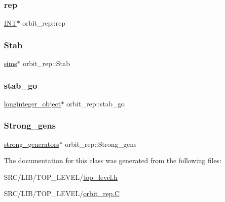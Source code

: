 \mbox{\label{classorbit__rep_a67d318af0ad6f7d7f2094e50801501b7}} 
\subsubsection{\texorpdfstring{rep}{rep}}
{\footnotesize\ttfamily \mbox{\hyperlink{galois_8h_a09fddde158a3a20bd2dcadb609de11dc}{I\+NT}}$\ast$ orbit\+\_\+rep\+::rep}

\mbox{\label{classorbit__rep_a69c61c216255b659630df7c89bf52fb9}} 
\subsubsection{\texorpdfstring{Stab}{Stab}}
{\footnotesize\ttfamily \mbox{\hyperlink{classsims}{sims}}$\ast$ orbit\+\_\+rep\+::\+Stab}

\mbox{\label{classorbit__rep_a2a7281428940925471b4a546ede7fe3d}} 
\subsubsection{\texorpdfstring{stab\+\_\+go}{stab\_go}}
{\footnotesize\ttfamily \mbox{\hyperlink{classlonginteger__object}{longinteger\+\_\+object}}$\ast$ orbit\+\_\+rep\+::stab\+\_\+go}

\mbox{\label{classorbit__rep_ac1ad77be51eee2a372556327a32898c9}} 
\subsubsection{\texorpdfstring{Strong\+\_\+gens}{Strong\_gens}}
{\footnotesize\ttfamily \mbox{\hyperlink{classstrong__generators}{strong\+\_\+generators}}$\ast$ orbit\+\_\+rep\+::\+Strong\+\_\+gens}



The documentation for this class was generated from the following files\+:\begin{DoxyCompactItemize}
\item 
S\+R\+C/\+L\+I\+B/\+T\+O\+P\+\_\+\+L\+E\+V\+E\+L/\mbox{\hyperlink{top__level_8h}{top\+\_\+level.\+h}}\item 
S\+R\+C/\+L\+I\+B/\+T\+O\+P\+\_\+\+L\+E\+V\+E\+L/\mbox{\hyperlink{orbit__rep_8_c}{orbit\+\_\+rep.\+C}}\end{DoxyCompactItemize}
